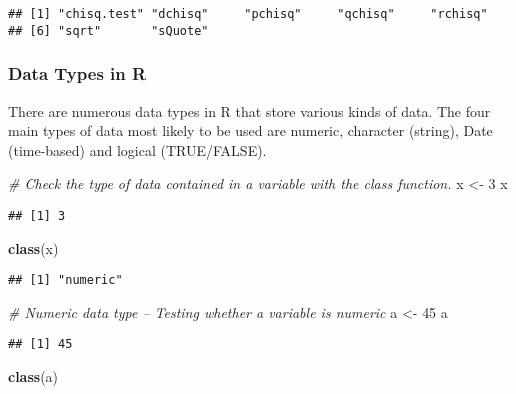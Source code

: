 \documentclass[
]{article}
\newenvironment{Shaded}{\begin{snugshade}}{\end{snugshade}}
\newcommand{\CommentTok}[1]{\textcolor[rgb]{0.56,0.35,0.01}{\textit{#1}}}
\newcommand{\DecValTok}[1]{\textcolor[rgb]{0.00,0.00,0.81}{#1}}
\newcommand{\KeywordTok}[1]{\textcolor[rgb]{0.13,0.29,0.53}{\textbf{#1}}}
\newcommand{\NormalTok}[1]{#1}
\newcommand{\StringTok}[1]{\textcolor[rgb]{0.31,0.60,0.02}{#1}}
\begin{document}
\begin{verbatim}
## [1] "chisq.test" "dchisq"     "pchisq"     "qchisq"     "rchisq"    
## [6] "sqrt"       "sQuote"
\end{verbatim}

\hypertarget{data-types-in-r}{%
\subsubsection{Data Types in R}\label{data-types-in-r}}

There are numerous data types in R that store various kinds of data. The
four main types of data most likely to be used are numeric, character
(string), Date (time-based) and logical (TRUE/FALSE).

\begin{Shaded}
\begin{Highlighting}[]
\CommentTok{# Check the type of data contained in a variable with the class function. }
\NormalTok{x <-}\StringTok{ }\DecValTok{3}
\NormalTok{x}
\end{Highlighting}
\end{Shaded}

\begin{verbatim}
## [1] 3
\end{verbatim}

\begin{Shaded}
\begin{Highlighting}[]
\KeywordTok{class}\NormalTok{(x)}
\end{Highlighting}
\end{Shaded}

\begin{verbatim}
## [1] "numeric"
\end{verbatim}

\begin{Shaded}
\begin{Highlighting}[]
\CommentTok{# Numeric data type -- Testing whether a variable is numeric}
\NormalTok{a <-}\StringTok{ }\DecValTok{45}
\NormalTok{a}
\end{Highlighting}
\end{Shaded}

\begin{verbatim}
## [1] 45
\end{verbatim}

\begin{Shaded}
\begin{Highlighting}[]
\KeywordTok{class}\NormalTok{(a)}
\end{Highlighting}
\end{Shaded}
\end{document}
